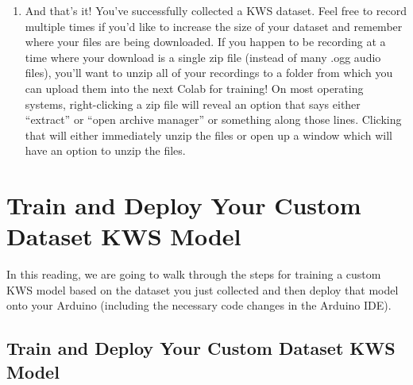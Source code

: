 \begin{enumerate}
  \item And that’s it! You’ve successfully collected a KWS dataset. Feel free to record multiple times if you’d like to increase the size of your dataset and remember where your files are being downloaded. If you happen to be recording at a time where your download is a single zip file (instead of many .ogg audio files), you’ll want to unzip all of your recordings to a folder from which you can upload them into the next Colab for training! On most operating systems, right-clicking a zip file will reveal an option that says either “extract” or “open archive manager” or something along those lines. Clicking that will either immediately unzip the files or open up a window which will have an option to unzip the files.
\end{enumerate}


\section{Train and Deploy Your Custom Dataset KWS Model}

In this reading, we are going to walk through the steps for training a custom KWS model based on the dataset you just collected and then deploy that model onto your Arduino (including the necessary code changes in the Arduino IDE).
    
\subsection{Train and Deploy Your Custom Dataset KWS Model}

